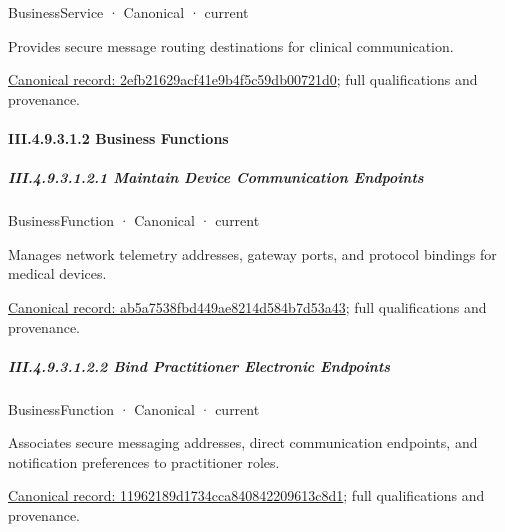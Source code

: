 \label{element:2efb21629acf41e9b4f5c59db00721d0}
{\small BusinessService · Canonical · current}\par

Provides secure message routing destinations for clinical communication.


{\footnotesize \href{../../../../continuum/business/business-service/2efb21629acf41e9b4f5c59db00721d0.md}{Canonical record: 2efb21629acf41e9b4f5c59db00721d0}; full qualifications and provenance.}\par
\paragraph*{III.4.9.3.1.2 Business Functions}
\label{navigation:III.4.9.3.1.2}

\subparagraph*{III.4.9.3.1.2.1 Maintain Device Communication Endpoints}
\label{navigation:III.4.9.3.1.2.1}

\label{element:ab5a7538fbd449ae8214d584b7d53a43}
{\small BusinessFunction · Canonical · current}\par

Manages network telemetry addresses, gateway ports, and protocol bindings for medical devices.


{\footnotesize \href{../../../../continuum/business/business-function/ab5a7538fbd449ae8214d584b7d53a43.md}{Canonical record: ab5a7538fbd449ae8214d584b7d53a43}; full qualifications and provenance.}\par
\subparagraph*{III.4.9.3.1.2.2 Bind Practitioner Electronic Endpoints}
\label{navigation:III.4.9.3.1.2.2}

\label{element:11962189d1734cca840842209613c8d1}
{\small BusinessFunction · Canonical · current}\par

Associates secure messaging addresses, direct communication endpoints, and notification preferences to practitioner roles.


{\footnotesize \href{../../../../continuum/business/business-function/11962189d1734cca840842209613c8d1.md}{Canonical record: 11962189d1734cca840842209613c8d1}; full qualifications and provenance.}\par
